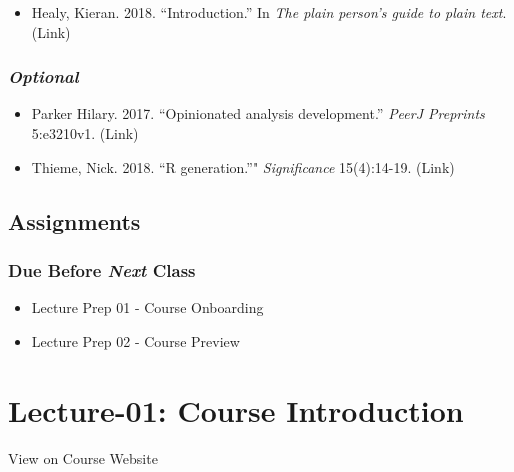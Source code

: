 \documentclass[]{book}
\providecommand{\tightlist}{%
  \setlength{\itemsep}{0pt}\setlength{\parskip}{0pt}}
\theoremstyle{definition}
\theoremstyle{definition}
\theoremstyle{definition}
\theoremstyle{remark}
\begin{document}
\begin{itemize}
\tightlist
\item
  Healy, Kieran. 2018. ``Introduction.'' In \emph{The plain person's
  guide to plain text}. (Link)
\end{itemize}

\hypertarget{optional}{%
\subsubsection*{\texorpdfstring{\emph{Optional}}{Optional}}\label{optional}}

\begin{itemize}
\tightlist
\item
  Parker Hilary. 2017. ``Opinionated analysis development.'' \emph{PeerJ
  Preprints} 5:e3210v1. (Link)
\item
  Thieme, Nick. 2018. ``R generation.''" \emph{Significance}
  15(4):14-19. (Link)
\end{itemize}

\hypertarget{assignments-1}{%
\subsection*{Assignments}\label{assignments-1}}

\hypertarget{due-before-next-class}{%
\subsubsection*{\texorpdfstring{Due Before \emph{Next}
Class}{Due Before Next Class}}\label{due-before-next-class}}

\begin{itemize}
\tightlist
\item
  Lecture Prep 01 - Course Onboarding
\item
  Lecture Prep 02 - Course Preview
\end{itemize}

\hypertarget{lecture-01-course-introduction}{%
\section*{Lecture-01: Course
Introduction}\label{lecture-01-course-introduction}}

View on Course Website
\end{document}
